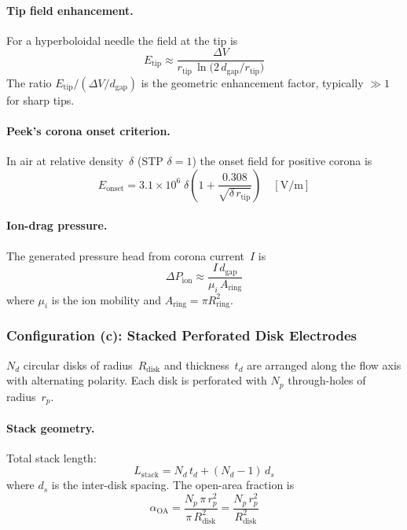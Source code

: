 \documentclass[11pt,a4paper]{article}
\begin{document}
\paragraph{Tip field enhancement.}
For a hyperboloidal needle the field at the tip is
\begin{equation}\label{eq:needle_tip}
  E_{\mathrm{tip}} \approx
    \frac{\Delta V}{r_{\mathrm{tip}}
    \,\ln\!\bigl(2\,d_{\mathrm{gap}} / r_{\mathrm{tip}}\bigr)}
\end{equation}
The ratio $E_{\mathrm{tip}} / ({\Delta V}/{d_{\mathrm{gap}}})$ is the
geometric enhancement factor, typically $\gg 1$ for sharp tips.

\paragraph{Peek's corona onset criterion.}
In air at relative density~$\delta$ (STP $\delta = 1$) the onset field for
positive corona is
\begin{equation}\label{eq:peek}
  E_{\mathrm{onset}} = 3.1\times10^{6}\;\delta\!
    \left(1 + \frac{0.308}{\sqrt{\delta\,r_{\mathrm{tip}}}}\right)
  \quad [\text{V/m}]
\end{equation}

\paragraph{Ion-drag pressure.}
The generated pressure head from corona current~$I$ is
\begin{equation}\label{eq:ion_drag_P}
  \Delta P_{\mathrm{ion}} \approx
    \frac{I\,d_{\mathrm{gap}}}{\mu_i\,A_{\mathrm{ring}}}
\end{equation}
where $\mu_i$ is the ion mobility and
$A_{\mathrm{ring}} = \pi R_{\mathrm{ring}}^2$.

\subsubsection{Configuration (c): Stacked Perforated Disk Electrodes}

$N_d$ circular disks of radius~$R_{\mathrm{disk}}$ and thickness~$t_d$
are arranged along the flow axis with alternating polarity.  Each disk is
perforated with $N_p$ through-holes of radius~$r_p$.

\paragraph{Stack geometry.}
Total stack length:
\begin{equation}\label{eq:stack_length}
  L_{\mathrm{stack}} = N_d\,t_d + (N_d - 1)\,d_s
\end{equation}
where $d_s$ is the inter-disk spacing.  The open-area fraction is
\begin{equation}\label{eq:oaf}
  \alpha_{\mathrm{OA}} = \frac{N_p\,\pi\,r_p^2}{\pi\,R_{\mathrm{disk}}^2}
  = \frac{N_p\,r_p^2}{R_{\mathrm{disk}}^2}
\end{equation}
\end{document}
